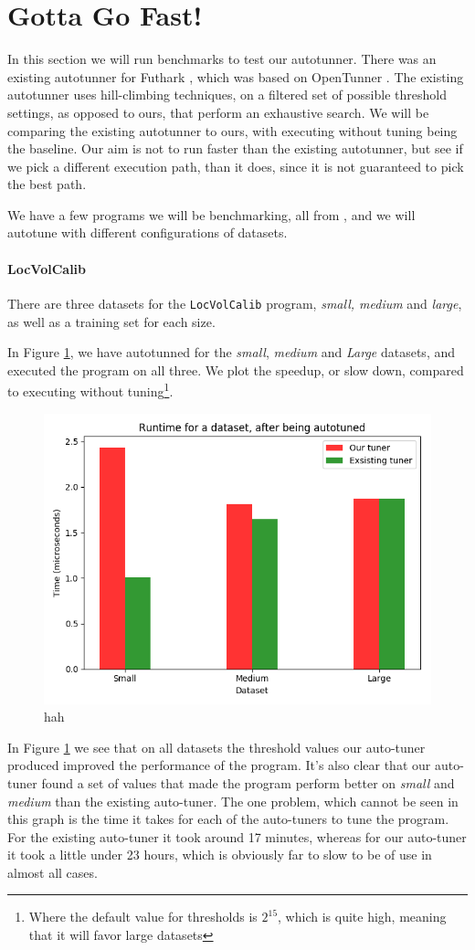 \section{Gotta Go Fast!}
In this section we will run benchmarks to test our autotunner. There was an
existing autotunner for Futhark \cite{oldtune}, which was based on OpenTunner
\cite{opentunner}. The existing autotunner uses hill-climbing techniques, on a
filtered set of possible threshold settings, as opposed to ours, that perform
an exhaustive search. We will be comparing the existing autotunner to ours,
with executing without tuning being the baseline. 
Our aim is not to run faster than the existing autotunner, but see if we pick a
different execution path, than it does, since it is not guaranteed to pick the
best path.

We have a few programs we will be benchmarking, all from \cite{ppopp}, and we
will autotune with different configurations of datasets.
\paragraph{LocVolCalib}
There are three datasets for the \texttt{LocVolCalib} program, \textit{small,
medium} and \textit{large}, as well as a training set for each size.

In Figure \ref{LocVolCalib-SmallMediumLarge}, we have autotunned for the
\textit{small}, \textit{medium} and \textit{Large} datasets, and executed the program on all
three. We plot the speedup, or slow down, compared to executing without
tuning\footnote{Where the default value for thresholds is $2^{15}$, which is
quite high, meaning that it will favor large datasets}.
\begin{figure}
	\centering
	\includegraphics[width=.7\textwidth]{../benchmarks/LocVolCalibSML.png}
  \caption{hah}
	\label{LocVolCalib-SmallMediumLarge}
\end{figure}
In Figure \ref{LocVolCalib-SmallMediumLarge} we see that on all datasets the
threshold values our auto-tuner produced improved the performance of the
program. It's also clear that our auto-tuner found a set of values that made
the program perform better on \textit{small} and \textit{medium} than the
existing auto-tuner. The one problem, which cannot be seen in this graph is the
time it takes for each of the auto-tuners to tune the program. For the existing
auto-tuner it took around 17 minutes, whereas for our auto-tuner it took a
little under 23 hours, which is obviously far to slow to be of use in almost
all cases. 

